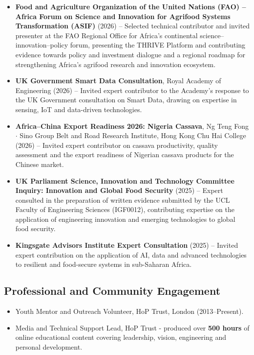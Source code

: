 \documentclass[a4paper,11pt]{article}
\begin{document}
\begin{itemize}

    \item \textbf{Food and Agriculture Organization of the United Nations (FAO) -- Africa Forum on Science and Innovation for Agrifood Systems Transformation (ASIF)} (2026) -- Selected technical contributor and invited presenter at the FAO Regional Office for Africa's continental science--innovation--policy forum, presenting the THRIVE Platform and contributing evidence towards policy and investment dialogue and a regional roadmap for strengthening Africa's agrifood research and innovation ecosystem.

    \item \textbf{UK Government Smart Data Consultation}, Royal Academy of Engineering (2026) -- Invited expert contributor to the Academy's response to the UK Government consultation on Smart Data, drawing on expertise in sensing, IoT and data-driven technologies.

    \item \textbf{Africa--China Export Readiness 2026: Nigeria Cassava}, Ng Teng Fong $\cdot$ Sino Group Belt and Road Research Institute, Hong Kong Chu Hai College (2026) -- Invited expert contributor on cassava productivity, quality assessment and the export readiness of Nigerian cassava products for the Chinese market.

    \item \textbf{UK Parliament Science, Innovation and Technology Committee Inquiry: Innovation and Global Food Security} (2025) -- Expert consulted in the preparation of written evidence submitted by the UCL Faculty of Engineering Sciences (IGF0012), contributing expertise on the application of engineering innovation and emerging technologies to global food security.

    \item \textbf{Kingsgate Advisors Institute Expert Consultation} (2025) -- Invited expert contribution on the application of AI, data and advanced technologies to resilient and food-secure systems in sub-Saharan Africa.

\end{itemize}

\subsection*{Professional and Community Engagement}

\begin{itemize}
    \item Youth Mentor and Outreach Volunteer, HoP Trust, London (2013--Present).
    \item Media and Technical Support Lead, HoP Trust - produced over \textbf{500 hours} of online educational content covering leadership, vision, engineering and personal development.
\end{itemize}
\end{document}
